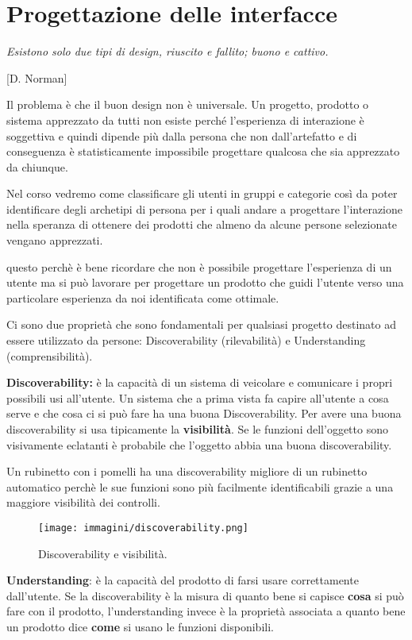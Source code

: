 \chapter{Progettazione delle interfacce}
\textit{Esistono solo due tipi di design, riuscito e fallito; buono e cattivo.}

[D. Norman]

\vspace{\baselineskip}

Il problema è che il buon design non è universale. Un progetto, prodotto o sistema apprezzato da tutti non esiste perché l'esperienza
di interazione è soggettiva e quindi dipende più dalla persona che non dall'artefatto e di conseguenza è statisticamente impossibile
progettare qualcosa che sia apprezzato da chiunque.

Nel corso vedremo come classificare gli utenti in gruppi e categorie così da poter identificare degli archetipi di persona per i quali
andare a progettare l'interazione nella speranza di ottenere dei prodotti che almeno da alcune persone selezionate vengano apprezzati.

questo perchè è bene ricordare che non è possibile progettare l'esperienza di un utente ma si può lavorare per progettare un prodotto che
guidi l'utente verso una particolare esperienza da noi identificata come ottimale.

Ci sono due proprietà che sono fondamentali per qualsiasi progetto destinato ad essere utilizzato da persone: Discoverability
(rilevabilità) e Understanding (comprensibilità).

\textbf{Discoverability:} è la capacità di un sistema di veicolare e comunicare i propri possibili usi all'utente. Un sistema che a prima
vista fa capire all'utente a cosa serve e che cosa ci si può fare ha una buona Discoverability. Per avere una buona discoverability si
usa tipicamente la \textbf{visibilità}. Se le funzioni dell'oggetto sono visivamente eclatanti è probabile che l'oggetto abbia una
buona discoverability.

Un rubinetto con i pomelli ha una discoverability migliore di un rubinetto automatico perchè le sue funzioni sono più facilmente
identificabili grazie a una maggiore visibilità dei controlli.


\begin{figure}[!h]
	\centering
	\texttt{[image: immagini/discoverability.png]}
	\caption{Discoverability e visibilità.}
\end{figure}


\textbf{Understanding}: è la capacità del prodotto di farsi usare correttamente dall'utente. Se la discoverability è la misura
di quanto bene si capisce \textbf{cosa} si può fare con il prodotto, l'understanding invece è la proprietà associata a quanto bene un
prodotto dice \textbf{come} si usano le funzioni disponibili.

